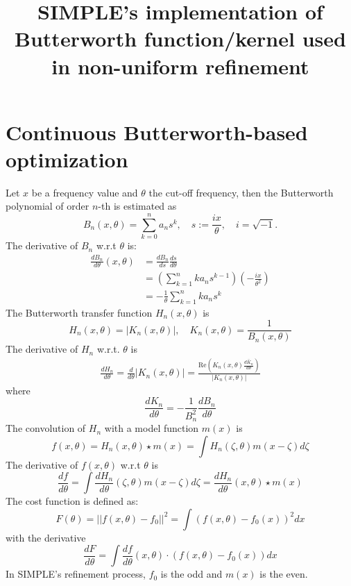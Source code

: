 \documentclass{article}
\begin{document}
\title{SIMPLE's implementation of Butterworth function/kernel used in non-uniform refinement}
\maketitle

\section{Continuous Butterworth-based optimization}
\noindent Let $x$ be a frequency value and $\theta$ the cut-off frequency, then the Butterworth polynomial of order $n$-th is estimated \cite{ButterworthWiki} as
\begin{equation}\label{eq1}
B_n(x,\theta) = \sum_{k = 0}^n a_n s^k, \quad s := \frac{ix}{\theta}, \quad i = \sqrt{-1}.
\end{equation}
The derivative of $B_n$ w.r.t $\theta$ is:
\begin{align}
\frac{dB_n}{d\theta}(x,\theta) &= \frac{dB_n}{ds}\frac{ds}{d\theta} \\
&= \left( \sum_{k = 1}^n ka_ns^{k-1} \right) \left(-\frac{ix}{\theta^2}\right) \\
&= -\frac{1}{\theta}\sum_{k=1}^n ka_ns^k
\end{align}
The Butterworth transfer function $H_n(x,\theta)$ is
\begin{equation}\label{eq5}
H_n(x, \theta) = \left| K_n(x,\theta) \right|, \quad K_n(x, \theta) = \frac{1}{B_n(x, \theta)}
\end{equation}
The derivative of $H_n$ w.r.t. $\theta$ is
\begin{align}\label{eq6}
\frac{dH_n}{d\theta} = \frac{d}{d\theta}\left| K_n(x,\theta) \right| = \frac{\text{Re}\left(K_n(x,\theta)\overline{\frac{dK_n}{d\theta}}\right)}{\left| K_n(x,\theta) \right|}
\end{align}
where
\begin{equation}\label{eq7}
\frac{dK_n}{d\theta} = -\frac{1}{B_n^2}\frac{dB_n}{d\theta}
\end{equation}
The convolution of $H_n$ with a model function $m(x)$ is
\begin{equation}\label{eq8}
f(x,\theta) = H_n(x,\theta) \star m(x) = \int H_n(\zeta, \theta)m(x-\zeta)d\zeta
\end{equation} 
The derivative of $f(x,\theta)$ w.r.t $\theta$ is
\begin{equation}\label{eq9}
\frac{df}{d\theta} = \int\frac{dH_n}{d\theta}(\zeta,\theta)m(x-\zeta)d\zeta = \frac{dH_n}{d\theta}(x,\theta) \star m(x)
\end{equation}
The cost function is defined as:
\begin{equation}\label{eq10}
F(\theta) = ||f(x,\theta) - f_0||^2 = \int (f(x,\theta) - f_0(x))^2dx
\end{equation}
with the derivative
\begin{equation}\label{eq11}
\frac{dF}{d\theta} = \int \frac{df}{d\theta}(x,\theta) \cdot (f(x,\theta) - f_0(x))dx
\end{equation}
In SIMPLE's refinement process, $f_0$ is the odd and $m(x)$ is the even.\\
\end{document}
